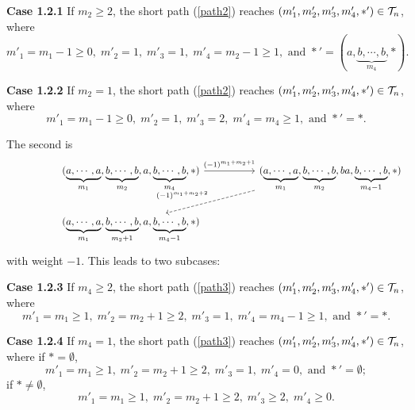 \documentclass[10pt, reqno]{amsart}
\theoremstyle{definition}
\theoremstyle{remark}
\numberwithin{equation}{section}
\begin{document}
\noindent \hspace*{4em}\textbf{Case 1.2.1} If \(m_2\ge 2\), the short path (\ref{path2}) reaches \((m'_1, m'_2, m'_3, m'_4, *' )\in \mathcal{T}_n\), where 
\begin{equation}
    m'_1= m_1-1 \ge 0,\;  m'_2= 1,\;  m'_3=1,\;  m'_4 =m_2-1\ge 1, \text{ and } *'=(a, \underbrace{b, \cdots,b}_{m_4},*).
\end{equation}

\noindent \hspace*{4em}\textbf{Case 1.2.2} If \(m_2=1\), the short path (\ref{path2}) reaches \((m'_1, m'_2, m'_3, m'_4, *' )\in \mathcal{T}_n\), where 
\begin{equation}
    m'_1= m_1-1 \ge 0,\;  m'_2= 1,\;  m'_3=2,\;  m'_4 =m_4\ge 1, \text{ and } *'=*.
\end{equation}

The second is
\begin{equation} \label{path3}
    \begin{tikzcd}[column sep=5em]
   & (\underbrace{a, \cdots,a}_{m_1}, \underbrace{b, \cdots,b}_{m_2},a, \underbrace{b, \cdots,b}_{m_4},*) \arrow[r,"(-1)^{m_1+m_2+1}"] & (\underbrace{a, \cdots,a}_{m_1}, \underbrace{b, \cdots,b}_{m_2}, ba, \underbrace{b, \cdots,b}_{m_4-1},*) \arrow[ld,dashed,"(-1)^{m_1+m_2+2}",swap] \\
   & (\underbrace{a, \cdots,a}_{m_1}, \underbrace{b, \cdots,b}_{m_2+1}, a, \underbrace{b, \cdots,b}_{m_4-1},*)
        \end{tikzcd}
\end{equation}
with weight $-1$. This leads to two subcases:

\noindent \hspace*{4em}\textbf{Case 1.2.3}   If \(m_4\ge 2\), the short path (\ref{path3}) reaches \((m'_1, m'_2, m'_3, m'_4, *')\in \mathcal{T}_n\), where
\begin{equation}
    m'_1= m_1 \ge 1,\;  m'_2= m_2+1\ge 2,\;  m'_3=1,\;  m'_4 =m_4-1\ge 1, \text{ and } *'=*.
\end{equation}

\noindent \hspace*{4em}\textbf{Case 1.2.4}   If \(m_4= 1\), the short path (\ref{path3}) reaches \((m'_1, m'_2, m'_3, m'_4, *') \in \mathcal{T}_n\), where if \(*= \emptyset\),
\begin{equation}
    m'_1= m_1 \ge 1,\;  m'_2= m_2+1\ge 2,\;  m'_3=1, \;  m'_4 =0, \text{ and } *'=\emptyset;
\end{equation}
if \(*\neq \emptyset\),
\begin{equation}
    m'_1= m_1 \ge 1, \;  m'_2= m_2+1\ge 2,\;  m'_3\ge 2,\;  m'_4 \ge 0.
\end{equation}
\end{document}
